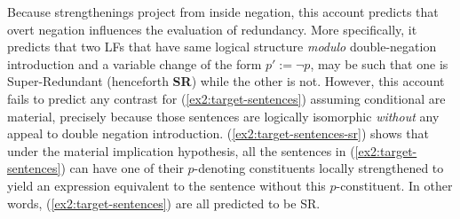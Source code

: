 Because strengthenings project from inside negation, this account predicts that overt negation influences the evaluation of redundancy. More specifically, it predicts that two LFs that have same logical structure \textit{modulo} double-negation introduction and a variable change of the form $p' := \neg p$, may be such that one is Super-Redundant (henceforth \textbf{SR}) while the other is not. However, this account fails to predict any contrast for (\ref{ex2:target-sentences}) assuming conditional are material, precisely because those sentences are logically isomorphic \textit{without} any appeal to double negation introduction. (\ref{ex2:target-sentences-sr}) shows that under the material implication hypothesis, all the sentences in (\ref{ex2:target-sentences}) can have one of their $p$-denoting constituents locally strengthened to yield an expression equivalent to the sentence without this $p$-constituent. In other words, (\ref{ex2:target-sentences}) are all predicted to be SR.

